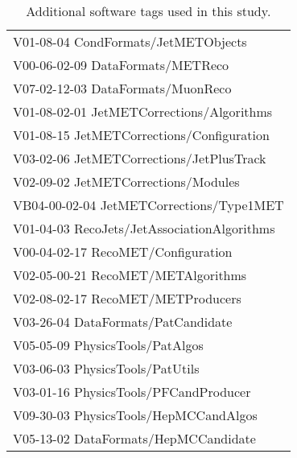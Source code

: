 \begin{table} [htb]
\begin{center} 
\begin{tabular}{|l|} \hline
{V01-08-04 CondFormats/JetMETObjects} \\
{V00-06-02-09 DataFormats/METReco} \\
{V07-02-12-03 DataFormats/MuonReco} \\
{V01-08-02-01 JetMETCorrections/Algorithms} \\
{V01-08-15 JetMETCorrections/Configuration} \\
{V03-02-06 JetMETCorrections/JetPlusTrack} \\
{V02-09-02 JetMETCorrections/Modules} \\
{VB04-00-02-04 JetMETCorrections/Type1MET} \\
{V01-04-03 RecoJets/JetAssociationAlgorithms} \\
{V00-04-02-17 RecoMET/Configuration} \\
{V02-05-00-21 RecoMET/METAlgorithms} \\
{V02-08-02-17 RecoMET/METProducers} \\
{V03-26-04 DataFormats/PatCandidate} \\
{V05-05-09 PhysicsTools/PatAlgos} \\
{V03-06-03 PhysicsTools/PatUtils} \\
{V03-01-16 PhysicsTools/PFCandProducer} \\
{V09-30-03 PhysicsTools/HepMCCandAlgos} \\
{V05-13-02 DataFormats/HepMCCandidate} \\
\hline
\end{tabular}
\caption{Additional software tags used in this study.\label{tab:tags}}
\end{center}
\end{table}
